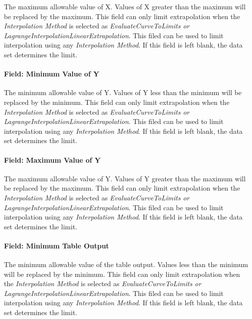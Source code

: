 The maximum allowable value of X. Values of X greater than the maximum will be replaced by the maximum. This field can only limit extrapolation when the \emph{Interpolation Method} is selected as \emph{EvaluateCurveToLimits or LagrangeInterpolationLinearExtrapolation}. This filed can be used to limit interpolation using any \emph{Interpolation Method}. If this field is left blank, the data set determines the limit.

\paragraph{Field: Minimum Value of Y}\label{field-minimum-value-of-y-000}

The minimum allowable value of Y. Values of Y less than the minimum will be replaced by the minimum. This field can only limit extrapolation when the \emph{Interpolation Method} is selected as \emph{EvaluateCurveToLimits or LagrangeInterpolationLinearExtrapolation}. This filed can be used to limit interpolation using any \emph{Interpolation Method}. If this field is left blank, the data set determines the limit.

\paragraph{Field: Maximum Value of Y}\label{field-maximum-value-of-y-000}

The maximum allowable value of Y. Values of Y greater than the maximum will be replaced by the maximum. This field can only limit extrapolation when the \emph{Interpolation Method} is selected as \emph{EvaluateCurveToLimits or LagrangeInterpolationLinearExtrapolation}. This filed can be used to limit interpolation using any \emph{Interpolation Method}. If this field is left blank, the data set determines the limit.

\paragraph{Field: Minimum Table Output}\label{field-minimum-table-output-1}

The minimum allowable value of the table output. Values less than the minimum will be replaced by the minimum. This field can only limit extrapolation when the \emph{Interpolation Method} is selected as \emph{EvaluateCurveToLimits or LagrangeInterpolationLinearExtrapolation}. This filed can be used to limit interpolation using any \emph{Interpolation Method}. If this field is left blank, the data set determines the limit.


